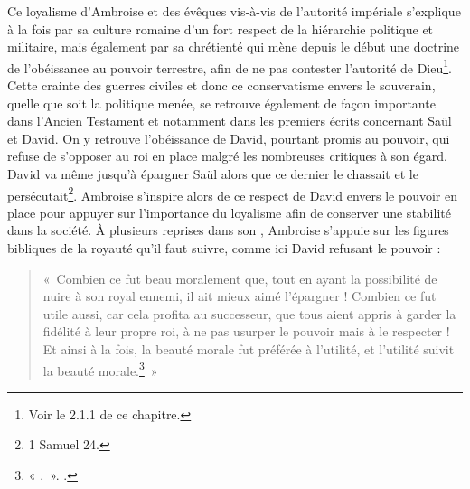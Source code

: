 Ce loyalisme d'Ambroise et des évêques vis-à-vis de l'autorité impériale s'explique à la fois par sa culture romaine d'un fort respect de la hiérarchie politique et militaire, mais également par sa chrétienté qui mène depuis le début une doctrine de l'obéissance au pouvoir terrestre, afin de ne pas contester l'autorité de Dieu\footnote{Voir le 2.1.1 de ce chapitre.}. Cette crainte des guerres civiles et donc ce conservatisme envers le souverain, quelle que soit la politique menée, se retrouve également de façon importante dans l'Ancien Testament et notamment dans les premiers écrits concernant Saül et David. On y retrouve l'obéissance de David, pourtant promis au pouvoir, qui refuse de s'opposer au roi en place malgré les nombreuses critiques à son égard. David va même jusqu'à épargner Saül alors que ce dernier le chassait et le persécutait\footnote{1 Samuel 24.}. Ambroise s'inspire alors de ce respect de David envers le pouvoir en place pour appuyer sur l'importance du loyalisme afin de conserver une stabilité dans la société. À plusieurs reprises dans son , Ambroise s'appuie sur les figures bibliques de la royauté qu'il faut suivre, comme ici David refusant le pouvoir :

\bigskip

\begin{quote}
«~Combien ce fut beau moralement que, tout en ayant la possibilité de nuire à son royal ennemi, il ait mieux aimé l’épargner ! Combien ce fut utile aussi, car cela profita au successeur, que tous aient appris à garder la fidélité à leur propre roi, à ne pas usurper le pouvoir mais à le respecter ! Et ainsi à la fois, la beauté morale fut préférée à l’utilité, et l’utilité suivit la beauté morale.\footnote{« .~». \cite[\nopp III, 60]{ambroise_devoirs_2}.}~»
\end{quote}

\bigskip

